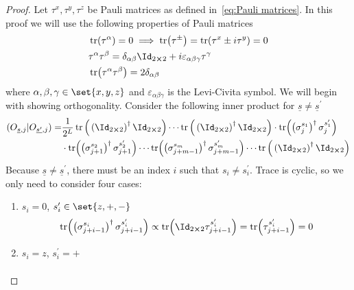 \begin{proof}
    Let \(\tau^{x},\tau^{y},\tau^{z}\) be Pauli matrices as defined in~\eqref{eq:Pauli matrices}.
    In this proof we will use the following properties of Pauli matrices
    \begin{align}
        &\tr(\tau^{\alpha}) = 0 \implies \tr(\tau^{\pm}) = \tr(\tau^x \pm i \tau^y) = 0\label{eq:traceless}\\
        &\tau^{\alpha}\tau^{\beta} = \delta_{\alpha \beta} \Id_{2\cross 2} + i \varepsilon_{\alpha\beta\gamma}
         \tau^{\gamma}\label{eq:product}\\
        &\tr(\tau^{\alpha} \tau^{\beta}) = 2\delta_{\alpha\beta}\label{eq:product trace}
    \end{align}
    where \(\alpha,\beta,\gamma \in \set{x,y,z}\) and \(\varepsilon_{\alpha\beta\gamma}\) is the Levi-Civita
    symbol.
    We will begin with showing orthogonality. Consider the following inner product for 
    \(\underline{s}\neq \underline{s}^{\prime}\)
    \begin{align}
    \hs{O_{\underline{s},j}}{O_{\underline{s^{\prime}},j}} =& \frac{1}{2^L} 
    \tr\Big(\left(\Id_{2\cross 2}\right)^{\dagger}\Id_{2\cross 2}\Big) \cdots 
    \tr\Big(\left(\Id_{2\cross 2}\right)^{\dagger}\Id_{2\cross 2}\Big)
    \cdot \tr(\left(\sigma_j^{s_1}\right)^{\dagger} \sigma_j^{s_1^{\prime}})\nonumber\\ 
    &\cdot \tr(\left(\sigma_{j+1}^{s_2}\right)^{\dagger} \sigma_{j+1}^{s_2^{\prime}})
    \cdots \tr(\left(\sigma_{j+m-1}^{s_m}\right)^{\dagger} \sigma_{j+m-1}^{s_m^{\prime}}) \cdots 
    \tr\Big(\left(\Id_{2\cross 2}\right)^{\dagger}\Id_{2\cross 2}\Big)
    \label{eq:orthogonality proof fragment}
    \end{align}
    Because \(\underline{s}\neq \underline{s}^{\prime}\), there must be an index \(i\) such that
    \(s_i\neq s_i^{\prime}\). Trace is cyclic, so we only need to consider four cases:
    \begin{enumerate}
        \item {\(s_i = 0\), \(s_i^{\prime} \in \set{z,+,-}\)
        \begin{align*}
            \tr(\left(\sigma^{s_i}_{j+i-1}\right)^{\dagger} \sigma^{s_i^{\prime}}_{j+i-1}) \propto
            \tr(\Id_{2\cross 2 }\tau^{s_i^{\prime}}_{j+i-1}) =
            \tr(\tau^{s_i^{\prime}}_{j+i-1})  = 0
        \end{align*}
        }
        \item { \(s_i = z\), \(s_i^{\prime} = +\)
        \begin{align*}

\end{align*}}
\end{enumerate}
\end{proof}
